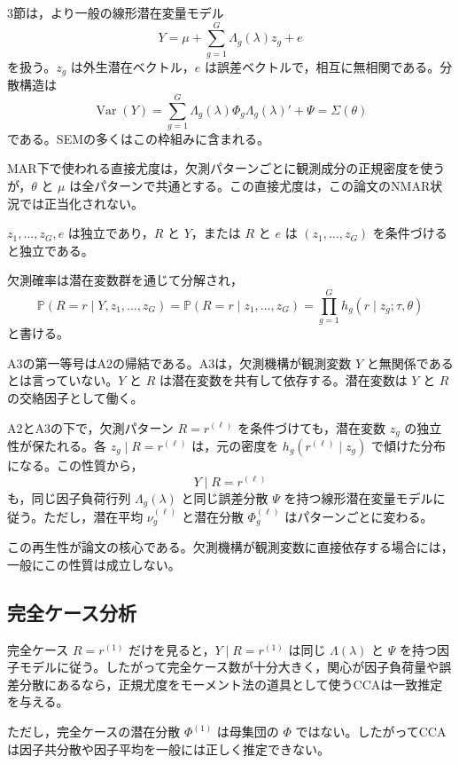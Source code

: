 \documentclass[dvipdfmx,autodetect-engine]{jsarticle}
\newcommand{\Prb}{\mathbb{P}}
\newcommand{\Var}{\operatorname{Var}}
\begin{document}
3節は，より一般の線形潜在変量モデル
\[
Y=\mu+\sum_{g=1}^G\Lambda_g(\lambda)z_g+e
\]
を扱う。$z_g$ は外生潜在ベクトル，$e$ は誤差ベクトルで，相互に無相関である。分散構造は
\[
\Var(Y)=\sum_{g=1}^G\Lambda_g(\lambda)\Phi_g\Lambda_g(\lambda)'+\Psi=\Sigma(\theta)
\]
である。SEMの多くはこの枠組みに含まれる。

MAR下で使われる直接尤度は，欠測パターンごとに観測成分の正規密度を使うが，$\theta$ と $\mu$ は全パターンで共通とする。この直接尤度は，この論文のNMAR状況では正当化されない。

\begin{description}[leftmargin=3.2em]
\item[A2] $z_1,\ldots,z_G,e$ は独立であり，$R$ と $Y$，または $R$ と $e$ は $(z_1,\ldots,z_G)$ を条件づけると独立である。
\item[A3] 欠測確率は潜在変数群を通じて分解され，
\[
\Prb(R=r\mid Y,z_1,\ldots,z_G)=\Prb(R=r\mid z_1,\ldots,z_G)=\prod_{g=1}^Gh_g(r\mid z_g;\tau,\theta)
\]
と書ける。
\end{description}

A3の第一等号はA2の帰結である。A3は，欠測機構が観測変数 $Y$ と無関係であるとは言っていない。$Y$ と $R$ は潜在変数を共有して依存する。潜在変数は $Y$ と $R$ の交絡因子として働く。

A2とA3の下で，欠測パターン $R=r^{(\ell)}$ を条件づけても，潜在変数 $z_g$ の独立性が保たれる。各 $z_g\mid R=r^{(\ell)}$ は，元の密度を $h_g(r^{(\ell)}\mid z_g)$ で傾けた分布になる。この性質から，
\[
Y\mid R=r^{(\ell)}
\]
も，同じ因子負荷行列 $\Lambda_g(\lambda)$ と同じ誤差分散 $\Psi$ を持つ線形潜在変量モデルに従う。ただし，潜在平均 $\nu_g^{(\ell)}$ と潜在分散 $\Phi_g^{(\ell)}$ はパターンごとに変わる。

この再生性が論文の核心である。欠測機構が観測変数に直接依存する場合には，一般にこの性質は成立しない。

\subsection*{完全ケース分析}

完全ケース $R=r^{(1)}$ だけを見ると，$Y\mid R=r^{(1)}$ は同じ $\Lambda(\lambda)$ と $\Psi$ を持つ因子モデルに従う。したがって完全ケース数が十分大きく，関心が因子負荷量や誤差分散にあるなら，正規尤度をモーメント法の道具として使うCCAは一致推定を与える。

ただし，完全ケースの潜在分散 $\Phi^{(1)}$ は母集団の $\Phi$ ではない。したがってCCAは因子共分散や因子平均を一般には正しく推定できない。
\end{document}
